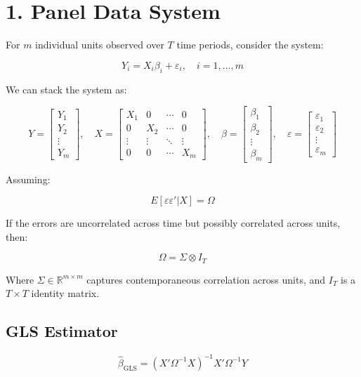 \documentclass[12pt, oneside]{article}
\begin{document}
\section*{1. Panel Data System}

For \( m \) individual units observed over \( T \) time periods, consider the system:

\[
Y_i = X_i \beta_i + \varepsilon_i, \quad i = 1, \dots, m
\]

We can stack the system as:

\[
Y = 
\begin{bmatrix}
Y_1 \\
Y_2 \\
\vdots \\
Y_m
\end{bmatrix}, \quad
X = 
\begin{bmatrix}
X_1 & 0 & \cdots & 0 \\
0 & X_2 & \cdots & 0 \\
\vdots & \vdots & \ddots & \vdots \\
0 & 0 & \cdots & X_m
\end{bmatrix}, \quad
\beta = 
\begin{bmatrix}
\beta_1 \\
\beta_2 \\
\vdots \\
\beta_m
\end{bmatrix}, \quad
\varepsilon = 
\begin{bmatrix}
\varepsilon_1 \\
\varepsilon_2 \\
\vdots \\
\varepsilon_m
\end{bmatrix}
\]

Assuming:

\[
E[\varepsilon \varepsilon' | X] = \Omega
\]

If the errors are uncorrelated across time but possibly correlated across units, then:

\[
\Omega = \Sigma \otimes I_T
\]

Where \( \Sigma \in \mathbb{R}^{m \times m} \) captures contemporaneous correlation across units, and \( I_T \) is a \( T \times T \) identity matrix.

\subsection*{GLS Estimator}

\[
\hat{\beta}_{\text{GLS}} = (X' \Omega^{-1} X)^{-1} X' \Omega^{-1} Y
\]
\end{document}
